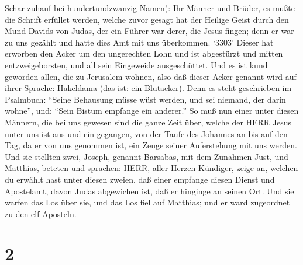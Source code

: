 Schar zuhauf bei hundertundzwanzig Namen):  Ihr Männer und
Brüder, es mußte die Schrift erfüllet werden, welche zuvor gesagt hat
der Heilige Geist durch den Mund Davids von Judas, der ein Führer war
derer, die Jesus fingen;  denn er war zu uns gezählt und
hatte dies Amt mit uns überkommen.  `3303' Dieser hat
erworben den Acker um den ungerechten Lohn und ist abgestürzt und mitten
entzweigeborsten, und all sein Eingeweide ausgeschüttet. 
Und es ist kund geworden allen, die zu Jerusalem wohnen, also daß dieser
Acker genannt wird auf ihrer Sprache: Hakeldama (das ist: ein
Blutacker).  Denn es steht geschrieben im Psalmbuch:
``Seine Behausung müsse wüst werden, und sei niemand, der darin wohne'',
und: ``Sein Bistum empfange ein anderer.''  So muß nun
einer unter diesen Männern, die bei uns gewesen sind die ganze Zeit
über, welche der HERR Jesus unter uns ist aus und ein gegangen,
 von der Taufe des Johannes an bis auf den Tag, da er von
uns genommen ist, ein Zeuge seiner Auferstehung mit uns werden.
 Und sie stellten zwei, Joseph, genannt Barsabas, mit dem
Zunahmen Just, und Matthias,  beteten und sprachen: HERR,
aller Herzen Kündiger, zeige an, welchen du erwählt hast unter diesen
zweien,  daß einer empfange diesen Dienst und Apostelamt,
davon Judas abgewichen ist, daß er hinginge an seinen Ort. 
Und sie warfen das Los über sie, und das Los fiel auf Matthias; und er
ward zugeordnet zu den elf Aposteln.

\hypertarget{section-1}{%
\section{2}\label{section-1}}

